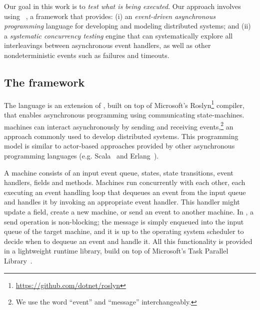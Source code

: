 
Our goal in this work is to \emph{test what is being executed}. Our approach involves using \psharp~\cite{deligiannis2015psharp}, a framework that provides: (i) an \emph{event-driven asynchronous programming} language for developing and modeling distributed systems; and (ii) a \emph{systematic concurrency testing} engine that can systematically explore all interleavings between asynchronous event handlers, as well as other nondeterministic events such as failures and timeouts.

\subsection{The \psharp framework}
\label{sec:method:psharp}

The \psharp language is an extension of \csharp, built on top of Microsoft's Roslyn\footnote{\url{https://github.com/dotnet/roslyn}} compiler, that enables asynchronous programming using communicating state-machines. \psharp machines can interact asynchronously by sending and receiving events,\footnote{We use the word ``event'' and ``message'' interchangeably.} an approach commonly used to develop distributed systems. This programming model is similar to actor-based approaches provided by other asynchronous programming languages (e.g. Scala~\cite{odersky2008programming} and Erlang~\cite{armstrong1996erlang}).

A \psharp machine consists of an input event queue, states, state transitions, event handlers, fields and methods. Machines run concurrently with each other, each executing an event handling loop that dequeues an event from the input queue and handles it by invoking an appropriate event handler. This handler might update a field, create a new machine, or send an event to another machine. In \psharp, a send operation is non-blocking; the message is simply enqueued into the input queue of the target machine, and it is up to the operating system scheduler to decide when to dequeue an event and handle it. All this functionality is provided in a lightweight runtime library, build on top of Microsoft's Task Parallel Library~\cite{leijen2009tpl}.

